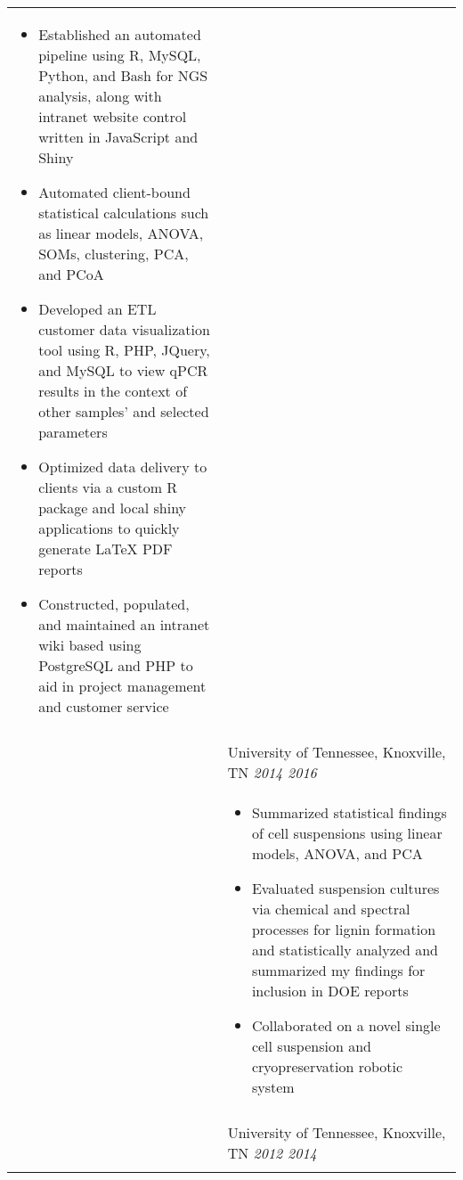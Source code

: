 \documentclass[8pt]{article}
\begin{document}
\begin{minipage}[ht]{.8\linewidth}
\begin{tabularx}{\linewidth}{p{1.8cm}M}
\begin{itemize}[topsep=-12pt,parsep=0em]
         \item Established an automated pipeline using R, MySQL, Python, and Bash for NGS analysis, along with intranet website control written in JavaScript and Shiny  %
         \item Automated client-bound statistical calculations such as linear models, ANOVA, SOMs, clustering, PCA, and PCoA %
         \item Developed an ETL customer data visualization tool using R, PHP, JQuery, and MySQL to view qPCR results in the context of other samples' and selected parameters %
         \item Optimized data delivery to clients via a custom R package and local shiny applications to quickly generate \LaTeX{} PDF reports  %
         \item Constructed, populated, and maintained an intranet wiki based using PostgreSQL and PHP to aid in project management and customer service
        \end{itemize} \\
       &  \\
       & University of Tennessee, Knoxville, TN \textit{2014 \textemdash{} 2016} \\
       & \begin{itemize}[topsep=-12pt,parsep=0em]
            \setlength\itemsep{0em}
            \item Summarized statistical findings of cell suspensions using linear models, ANOVA, and PCA %
            \item Evaluated suspension cultures via chemical and spectral processes for lignin formation and statistically analyzed and summarized my findings for inclusion in DOE reports %
            \item Collaborated on a novel single cell suspension and cryopreservation robotic system %
         \end{itemize} \\
       &  \\
       & University of Tennessee, Knoxville, TN \textit{2012 \textemdash{} 2014} \\
       & \begin{itemize}[topsep=-12pt,parsep=0em]
            \setlength\itemsep{0em}

\end{itemize}
\end{tabularx}
\end{minipage}
\end{document}
